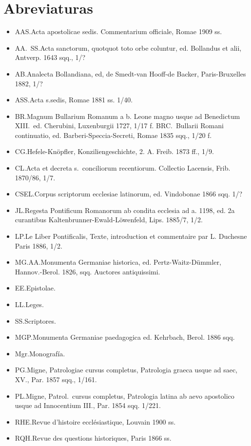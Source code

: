 \raggedbottom{} \documentclass[12pt]{book}
\begin{document}
\section{Abreviaturas}
\begin{itemize}
  \item AAS.\@ Acta apostolicae sedis. Commentarium officiale, Romae 1909 ss.
  \item AA.\ SS.\@ Acta sanctorum, quotquot toto orbe coluntur, ed. Bollandus et alii, Antverp. 1643 sqq., 1/?
  \item AB.\@ Analecta Bollandiana, ed, de Smedt-van Hooff-de Backer, Paris-Bruxelles 1882, 1/?
  \item ASS.\@ Acta s.\@ sedis, Romae 1881 ss. 1/40.
  \item BR.\@ Magnum Bullarium Romanum a b. Leone magno usque ad Benedictum XIII.\ ed. Cherubini, Luxenburgii 1727, 1/17 f. BRC.\ Bullarii Romani continuatio, ed. Barberi-Speccia-Secreti, Romae 1835 sqq., 1/20 f.
  \item CG.\@ Hefele-Knöpfler, Konziliengeschichte, 2. A. Freib. 1873 ff., 1/9.
  \item CL.\@ Acta et decreta s.\ conciliorum recentiorum. Collectio Lacensis, Frib. 1870/86, 1/7.
  \item CSEL.\@ Corpus scriptorum ecclesiae latinorum, ed. Vindobonae 1866 sqq. 1/?
  \item JL.\@ Regesta Pontificum Romanorum ab condita ecclesia ad a. 1198, ed. 2a curantibus Kaltenbrunner-Ewald-Löwenfeld, Lips. 1885/7, 1/2.
  \item LP.\@ Le Liber Pontificalis, Texte, introduction et commentaire par L. Duchesne Paris 1886, 1/2.
  \item MG.\@ AA.\@ Monumenta Germaniae historica, ed. Pertz-Waitz-Dümmler, Hannov.-Berol. 1826, sqq. Auctores antiquissimi.
  \item EE.\@ Epistolae.
  \item LL.\@ Leges.
  \item SS.\@ Scriptores.
  \item MGP.\@ Monumenta Germaniae paedagogica ed. Kehrbach, Berol. 1886 sqq.
  \item Mgr.\@ Monografía.

  \item PG.\@ Migne, Patrologiae cursus completus, Patrologia graeca usque ad saec, XV., Par. 1857 sqq., 1/161.

  \item PL.\@ Migne, Patrol.\ cursus completus, Patrologia latina ab aevo apostolico usque ad Innocentium III., Par. 1854 sqq. 1/221.
  \item RHE.\@ Revue d'histoire ecclésiastique, Louvain 1900 ss.
  \item RQH.\@ Revue des questions historiques, Paris 1866 ss.
\end{itemize}
\end{document}
